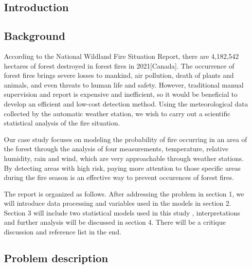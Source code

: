 \documentclass[12pt]{article}
\theoremstyle{plain}
\begin{document}
\begin{spacing}{1}
\begin{flushleft}


\newpage
{}
\justifying  
\section{Introduction}

\subsection{Background}
According to the National Wildland Fire Situation Report, there are 4,182,542 hectares of forest destroyed in forest fires in 2021[Canada]. The occurrence of forest fires brings severe losses to mankind, air pollution, death of plants and animals, and even threats to human life and safety. However, traditional manual supervision and report is expensive and inefficient, so it would be beneficial to develop an efficient and low-cost detection method. Using the meteorological data collected by the automatic weather station, we wish to carry out a scientific statistical analysis of the fire situation.

\vspace{2.0mm}

Our case study focuses on modeling the probability of fire occurring in an area of the forest through the analysis of four measurements, temperature, relative humidity, rain and wind, which are very approachable through weather stations. By detecting areas with high risk, paying more attention to those specific areas during the fire season is an effective way to prevent occurences of forest fires.

\vspace{2.0mm}

The report is organized as follows. After addressing the problem in section 1, we will introduce data processing and variables used in the models in section 2. Section 3 will include two statistical models used in this study , interpretations and further analysis will be discussed in section 4. There will be a critique discussion and  reference list in the end.

\vspace{2.0mm}
 

 
 
\subsection{Problem description}


\end{flushleft}
\end{spacing}
\end{document}
